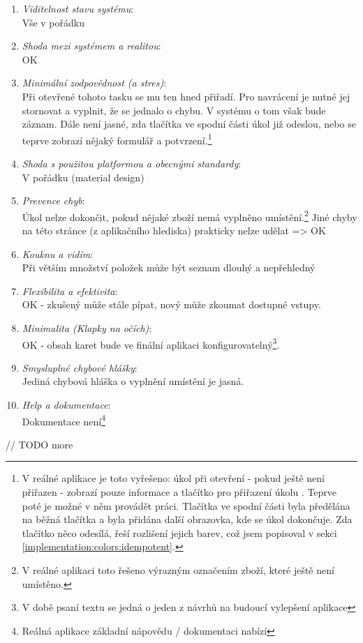 \begin{enumerate}
  \item \emph{Viditelnost stavu systému}:\\Vše v pořádku
  \item \emph{Shoda mezi systémem a realitou}:\\OK
  \item \emph{Minimální zodpovědnost (a stres)}:\\Při otevřené tohoto tasku se mu ten hned přiřadí. Pro navrácení je nutné jej stornovat a vyplnit, že se jednalo o chybu. V systému o tom však bude záznam. Dále není jasné, zda tlačítka ve spodní části úkol již odeslou, nebo se teprve zobrazí nějaký formulář a potvrzení.\footnote{V reálné aplikace je toto vyřešeno: úkol při otevření - pokud ještě není přiřazen - zobrazí pouze informace a tlačítko pro přiřazení úkolu . Teprve poté je možné v něm provádět práci. Tlačítka ve spodní části byla předělána na běžná tlačítka a byla přidána další obrazovka, kde se úkol dokončuje. Zda tlačítko něco odesílá, řeší rozlišení jejich barev, což jsem popisoval v sekci \ref{implementation:colors:idempotent}.}
  \item \emph{Shoda s použitou platformou a obecnými standardy}:\\V pořádku (material design)
  \item \emph{Prevence chyb}:\\Úkol nelze dokončit, pokud nějaké zboží nemá vyplněno umístění.\footnote{V reálné aplikaci toto řešeno výrazným označením zboží, které ještě není umístěno.} Jiné chyby na této stránce (z aplikačního hlediska) prakticky nelze udělat => OK
  \item \emph{Kouknu a vidím}:\\Při větším množství položek může být seznam dlouhý a nepřehledný
  \item \emph{Flexibilita a efektivita}:\\OK - zkušený může stále pípat, nový může zkoumat dostupné vstupy.
  \item \emph{Minimalita (Klapky na očích)}:\\OK - obsah karet bude ve finální aplikaci konfigurovatelný\footnote{V době psaní textu se jedná o jeden z návrhů na budoucí vylepšení aplikace}.
  \item \emph{Smysluplné chybové hlášky}:\\Jediná chybová hláška o vyplnění umístění je jasná.
  \item \emph{Help a dokumentace}:\\Dokumentace není\footnote{Reálná aplikace základní nápovědu / dokumentaci nabízí}
\end{enumerate}

// TODO more
